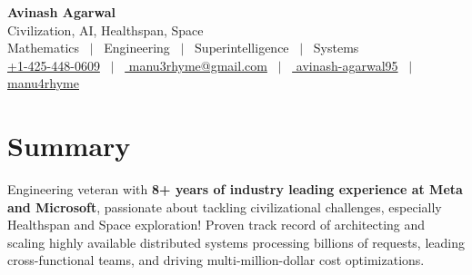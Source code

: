 \documentclass[a4paper,11pt]{article}
\newcommand{\socialicon}[1]{\raisebox{-0.05em}{\resizebox{!}{1em}{#1}}}
\newcommand{\headerfontiii}{\fontfamily{ppl}\selectfont} %
\begin{document}
\headerfontiii

\vspace{-9mm}
\begin{center}
    {\Huge \textbf{Avinash Agarwal}} \\[8pt]
    \large
    Civilization, AI, Healthspan, Space \\[8pt]
    Mathematics \ $|$ \ Engineering \ $|$ \ Superintelligence \ $|$ \ Systems \\[8pt]
    \href{https://wa.me/14254480609}{\socialicon{\faWhatsapp} +1-425-448-0609} \ $|$ \ 
    \href{mailto:manu3rhyme@gmail.com}{\socialicon{\faEnvelope} manu3rhyme@gmail.com} \ $|$ \ 
    \href{https://www.linkedin.com/in/avinash-agarwal95/}{\socialicon{\faLinkedin} avinash-agarwal95} \ $|$ \ 
    \href{https://github.com/manu4rhyme}{\socialicon{\faGithub} manu4rhyme}
\end{center}

\fontfamily{phv}\selectfont
\vspace{1mm}

\section{\Large{\textbf{Summary}}}
\vspace{1mm}
Engineering veteran with \textbf{8+ years of industry leading experience at Meta and Microsoft}, passionate about tackling civilizational challenges, especially Healthspan and Space exploration! Proven track record of architecting and scaling highly available distributed systems processing billions of requests, leading cross-functional teams, and driving multi-million-dollar cost optimizations.
\end{document}
